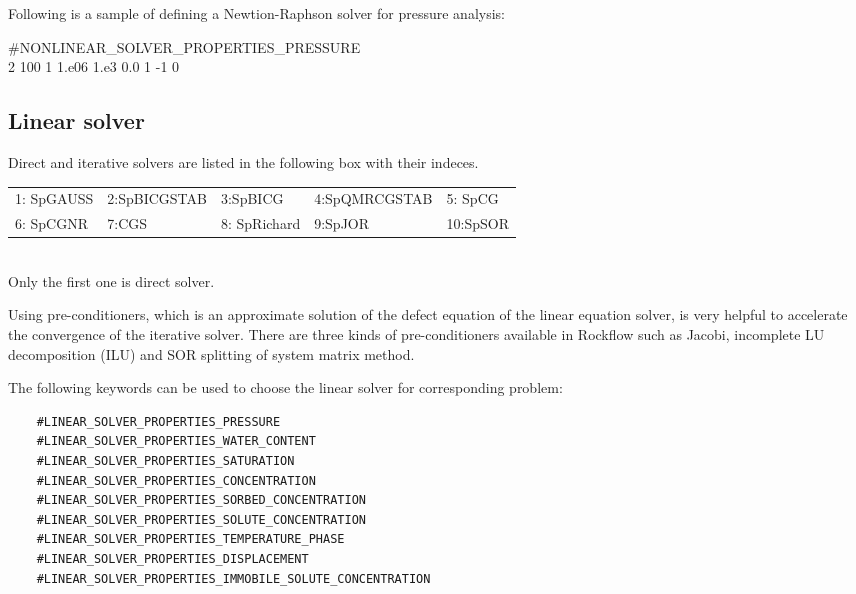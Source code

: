 Following is a sample of defining a Newtion-Raphson solver for pressure analysis:\\

\shadowbox
 {
   \parbox[c]{10cm}
   {

         \#NONLINEAR\_SOLVER\_PROPERTIES\_PRESSURE\\
         2 100 1 1.e06 1.e3 0.0 1 -1 0
   }
  }

\subsection{Linear solver}
Direct and iterative solvers are listed in the following box with their indeces.\\
 \begin{tabular}{||lllll||}
  \hline
  \hline
   1: SpGAUSS & 2:SpBICGSTAB &3:SpBICG     & 4:SpQMRCGSTAB & 5: SpCG\\
   6: SpCGNR  & 7:CGS        &8: SpRichard & 9:SpJOR       & 10:SpSOR\\
  \hline
  \hline
  \end{tabular}\\
Only the first one is direct solver.

Using pre-conditioners, which is an approximate solution of the defect equation of the linear equation solver, is very
helpful to accelerate the convergence of the iterative solver. There are three kinds of pre-conditioners available in
Rockflow such as Jacobi, incomplete LU decomposition (ILU) and SOR splitting  of system matrix method.


The following keywords can be used to choose the linear solver for corresponding problem:
  \begin{verbatim}
    #LINEAR_SOLVER_PROPERTIES_PRESSURE
    #LINEAR_SOLVER_PROPERTIES_WATER_CONTENT
    #LINEAR_SOLVER_PROPERTIES_SATURATION
    #LINEAR_SOLVER_PROPERTIES_CONCENTRATION
    #LINEAR_SOLVER_PROPERTIES_SORBED_CONCENTRATION
    #LINEAR_SOLVER_PROPERTIES_SOLUTE_CONCENTRATION
    #LINEAR_SOLVER_PROPERTIES_TEMPERATURE_PHASE
    #LINEAR_SOLVER_PROPERTIES_DISPLACEMENT
    #LINEAR_SOLVER_PROPERTIES_IMMOBILE_SOLUTE_CONCENTRATION
 \end{verbatim}


